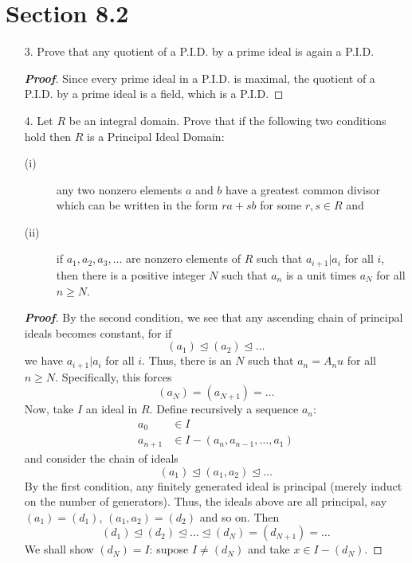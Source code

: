 \documentclass[12pt,leqno]{book}
\theoremstyle{definition}
\newenvironment{Proof}{\begin{proof}[\textnormal{\textbf{Proof}}]}{\end{proof}}
\begin{document}
\section*{Section 8.2}
\begin{enumerate}
 \item [3.] Prove that any quotient of a P.I.D. by a prime ideal is again a P.I.D.

\begin{Proof}
 Since every prime ideal in a P.I.D. is maximal, the quotient of a P.I.D. by a prime ideal is a field, which is a P.I.D.
\end{Proof}

 \item [4.] Let $R$ be an integral domain. Prove that if the following two conditions hold then $R$ is a Principal Ideal Domain:
  \begin{description}
   \item [(i)] any two nonzero elements $a$ and $b$ have a greatest common divisor which can be written in the form $ra+sb$ for some $r,s\in R$ and
   \item [(ii)] if $a_1,a_2,a_3,\hdots$ are nonzero elements of $R$ such that $a_{i+1}|a_i$ for all $i$, then there is a positive integer $N$ such that $a_n$ is a unit times $a_N$ for all $n\geq N$.
  \end{description}

\begin{Proof}
 By the second condition, we see that any ascending chain of principal ideals becomes constant, for if \[(a_1)\unlhd(a_2)\unlhd\hdots\] we have $a_{i+1}|a_i$ for all $i$. Thus, there is an $N$ such that $a_n=A_nu$ for all $n\geq N$. Specifically, this forces \[(a_N)=(a_{N+1})=\hdots\] Now, take $I$ an ideal in $R$. Define recursively a sequence $a_n$: \begin{align*}a_0&\in I\\a_{n+1}&\in I-(a_n,a_{n-1},\hdots,a_1)\end{align*} and consider the chain of ideals \[(a_1)\unlhd(a_1,a_2)\unlhd\hdots\] By the first condition, any finitely generated ideal is principal (merely induct on the number of generators). Thus, the ideals above are all principal, say $(a_1)=(d_1)$, $(a_1,a_2)=(d_2)$ and so on. Then \[(d_1)\unlhd(d_2)\unlhd\hdots\unlhd(d_N)=(d_{N+1})=\hdots\] We shall show $(d_N)=I$: supose $I\not=(d_N)$ and take $x\in I-(d_N)$. 
\end{Proof}
\end{enumerate}
\end{document}
